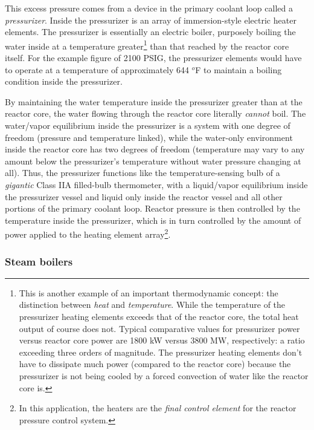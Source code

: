 This excess pressure comes from a device in the primary coolant loop called a \textit{pressurizer}.  Inside the pressurizer is an array of immersion-style electric heater elements.  The pressurizer is essentially an electric boiler, purposely boiling the water inside at a temperature greater\footnote{This is another example of an important thermodynamic concept: the distinction between \textit{heat} and \textit{temperature}.  While the temperature of the pressurizer heating elements exceeds that of the reactor core, the total heat output of course does not.  Typical comparative values for pressurizer power versus reactor core power are 1800 kW versus 3800 MW, respectively: a ratio exceeding three orders of magnitude.  The pressurizer heating elements don't have to dissipate much power (compared to the reactor core) because the pressurizer is not being cooled by a forced convection of water like the reactor core is.} than that reached by the reactor core itself.  For the example figure of 2100 PSIG, the pressurizer elements would have to operate at a temperature of approximately 644 $^{o}$F to maintain a boiling condition inside the pressurizer.

By maintaining the water temperature inside the pressurizer greater than at the reactor core, the water flowing through the reactor core literally \textit{cannot} boil.  The water/vapor equilibrium inside the pressurizer is a system with one degree of freedom (pressure and temperature linked), while the water-only environment inside the reactor core has two degrees of freedom (temperature may vary to any amount below the pressurizer's temperature without water pressure changing at all).  Thus, the pressurizer functions like the temperature-sensing bulb of a \textit{gigantic} Class IIA filled-bulb thermometer, with a liquid/vapor equilibrium inside the pressurizer vessel and liquid only inside the reactor vessel and all other portions of the primary coolant loop.  Reactor pressure is then controlled by the temperature inside the pressurizer, which is in turn controlled by the amount of power applied to the heating element array\footnote{In this application, the heaters are the \textit{final control element} for the reactor pressure control system.}.





\filbreak
\subsubsection{Steam boilers}

